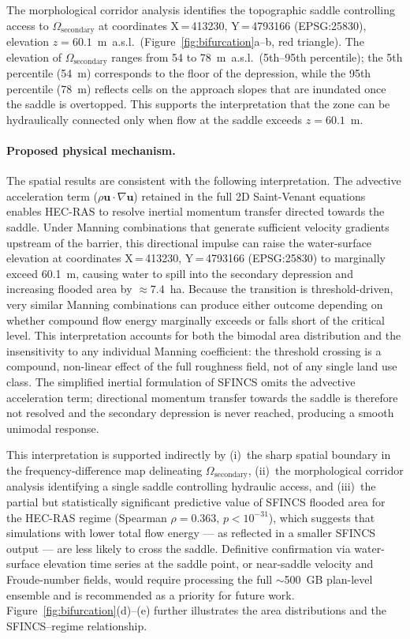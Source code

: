 \documentclass[review,12pt]{elsarticle}
\newcommand{\sfincs}{\textsc{SFINCS}}
\newcommand{\hecras}{\textsc{HEC-RAS}}
\begin{document}
The morphological corridor analysis identifies the topographic saddle
controlling access to $\Omega_{\mathrm{secondary}}$ at coordinates
X\,=\,413230, Y\,=\,4793166 (EPSG:25830), elevation
$z = 60.1$~m~a.s.l.\ (Figure~\ref{fig:bifurcation}a--b, red triangle).
The elevation of $\Omega_{\mathrm{secondary}}$ ranges from 54 to 78~m~a.s.l.\
(5th--95th percentile); the 5th percentile (54~m) corresponds to the floor
of the depression, while the 95th percentile (78~m) reflects cells on the
approach slopes that are inundated once the saddle is overtopped.
This supports the interpretation that the zone can be hydraulically connected only when flow at
the saddle exceeds $z = 60.1$~m.

\paragraph{Proposed physical mechanism.}
The spatial results are consistent with the following interpretation.
The advective acceleration term ($\rho\mathbf{u}\cdot\nabla\mathbf{u}$)
retained in the full 2D Saint-Venant equations enables \hecras{} to resolve
inertial momentum transfer directed towards the saddle.
Under Manning combinations that generate sufficient velocity gradients upstream
of the barrier, this directional impulse can raise the water-surface elevation
at coordinates X\,=\,413230, Y\,=\,4793166 (EPSG:25830) to marginally exceed
60.1~m, causing water to spill into the secondary depression and increasing
flooded area by $\approx 7.4$~ha.
Because the transition is threshold-driven, very similar Manning combinations
can produce either outcome depending on whether compound flow energy marginally
exceeds or falls short of the critical level.
This interpretation accounts for both the bimodal area distribution and
the insensitivity to any individual Manning coefficient: the threshold crossing
is a compound, non-linear effect of the full roughness field, not of any
single land use class.
The simplified inertial formulation of \sfincs{} omits the advective
acceleration term; directional momentum transfer towards the saddle is therefore
not resolved and the secondary depression is never reached, producing a smooth
unimodal response.

This interpretation is supported indirectly by (i)~the sharp spatial boundary
in the frequency-difference map delineating $\Omega_{\mathrm{secondary}}$,
(ii)~the morphological corridor analysis identifying a single saddle controlling
hydraulic access, and (iii)~the partial but statistically significant predictive
value of \sfincs{} flooded area for the \hecras{} regime
(Spearman $\rho = 0.363$, $p < 10^{-31}$), which suggests that simulations with
lower total flow energy --- as reflected in a smaller \sfincs{} output --- are
less likely to cross the saddle.
Definitive confirmation via water-surface elevation time series at the saddle
point, or near-saddle velocity and Froude-number fields, would require
processing the full $\sim$500~GB plan-level ensemble and is recommended as a
priority for future work.
Figure~\ref{fig:bifurcation}(d)--(e) further illustrates the area
distributions and the \sfincs{}--regime relationship.
\end{document}

